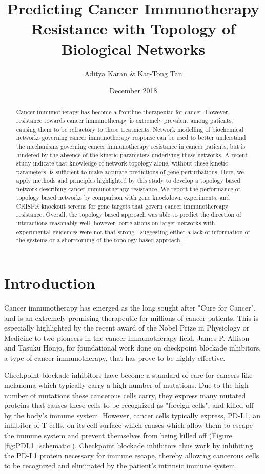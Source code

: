 \documentclass{article}
\title{Predicting Cancer Immunotherapy Resistance with Topology of Biological Networks}
\author{
  Aditya Karan \& Kar-Tong Tan
}
\date{December 2018}
\begin{document}
\maketitle



\begin{abstract}
Cancer immunotherapy has become a frontline therapeutic for cancer. However, resistance towards cancer immunotherapy is extremely prevalent among patients, causing them to be refractory to these treatments. Network modelling of biochemical networks governing cancer immunotherapy response can be used to better understand the mechanisms governing cancer immunotherapy resistance in cancer patients, but is hindered by the absence of the kinetic parameters underlying these networks. A recent study indicate that knowledge of network topology alone, without these kinetic parameters, is sufficient to make accurate predictions of gene perturbations. Here, we apply methods and principles highlighted by this study to develop a topology based network describing cancer immunotherapy resistance. We report the performance of topology based networks by comparison with gene knockdown experiments, and CRISPR knockout screens for gene targets that govern cancer immunothereapy resistance. Overall, the topology based approach was able to predict the direction of interactions reasonably well, however, correlations on larger networks with experimental evidences were not that strong - suggesting either a lack of information of the systems or a shortcoming of the topology based approach. 

\end{abstract}


\section{Introduction}

Cancer immunotherapy has emerged as the long sought after "Cure for Cancer", and is an extremely promising therapeutic for millions of cancer patients. This is especially highlighted by the recent award of the Nobel Prize in Physiology or Medicine to two pioneers in the cancer immunotherapy field, James P. Allison and Tasuku Honjo, for foundational work done on checkpoint blockade inhibitors, a type of cancer immunotherapy, that has prove to be highly effective. 

Checkpoint blockade inhibitors have become a standard of care for cancers like melanoma which typically carry a high number of mutations. Due to the high number of mutations these cancerous cells carry, they express many mutated proteins that causes these cells to be recognized as "foreign cells", and killed off by the body's immune system. However, cancer cells typically express, PD-L1, an inhibitor of T-cells, on its cell surface which causes which allow them to escape the immune system and prevent themselves from being killed off (Figure \ref{fig:PDL1_schematic}). Checkpoint blockade inhibitors thus work by inhibiting the PD-L1 protein necessary for immune escape, thereby allowing cancerous cells to be recognized and eliminated by the patient's intrinsic immune system.
\end{document}
